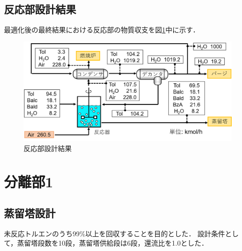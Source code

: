 \documentclass[a4j]{jsreport}
\begin{document}
\section{反応部設計結果}
最適化後の最終結果における反応部の物質収支を図\ref{反応部設計結果の図}中に示す．
\begin{figure}[htbp]
    \label{反応部設計結果の図}
    \begin{center}
        \includegraphics[scale=0.7]{ReactionSectionConclusion.png}
        \caption{反応部設計結果}
    \end{center}
\end{figure}


\newpage
\chapter{分離部1}
\section{蒸留塔設計}
未反応トルエンのうち99\%以上を回収することを目的とした．
設計条件として，蒸留塔段数を10段，蒸留塔供給段は6段，還流比を1.0とした．
\end{document}
